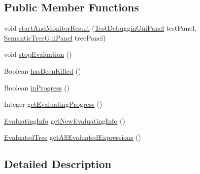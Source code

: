 \subsection*{Public Member Functions}
\begin{DoxyCompactItemize}
\item 
void \hyperlink{interfaceit_1_1emarolab_1_1cagg_1_1core_1_1evaluation_1_1interfacing_1_1GuiEvaluationInterface_adfc8f64a0eacda3e0dd7e9ce8a59d37e}{start\-And\-Monitor\-Result} (\hyperlink{classit_1_1emarolab_1_1cagg_1_1debugging_1_1baseComponents_1_1customPanel_1_1TestDebugginGuiPanel}{Test\-Debuggin\-Gui\-Panel} test\-Panel, \hyperlink{classit_1_1emarolab_1_1cagg_1_1debugging_1_1baseComponents_1_1customPanel_1_1SemanticTreeGuiPanel}{Semantic\-Tree\-Gui\-Panel} tree\-Panel)
\item 
void \hyperlink{interfaceit_1_1emarolab_1_1cagg_1_1core_1_1evaluation_1_1interfacing_1_1GuiEvaluationInterface_a9088bd8a49d34a9b9925fc577b226a61}{stop\-Evaluation} ()
\item 
Boolean \hyperlink{interfaceit_1_1emarolab_1_1cagg_1_1core_1_1evaluation_1_1interfacing_1_1GuiEvaluationInterface_abefc2330a6288d4b4ccaed7a530c65ca}{has\-Been\-Killed} ()
\item 
Boolean \hyperlink{interfaceit_1_1emarolab_1_1cagg_1_1core_1_1evaluation_1_1interfacing_1_1GuiEvaluationInterface_a2f8c453178460998dbfe966c5d409652}{in\-Progress} ()
\item 
Integer \hyperlink{interfaceit_1_1emarolab_1_1cagg_1_1core_1_1evaluation_1_1interfacing_1_1GuiEvaluationInterface_a998af18ddb63f0ac9d8bb3423a7b2eab}{get\-Evaluating\-Progress} ()
\item 
\hyperlink{classit_1_1emarolab_1_1cagg_1_1core_1_1evaluation_1_1interfacing_1_1GuiEvaluationInterface_1_1EvaluatingInfo}{Evaluating\-Info} \hyperlink{interfaceit_1_1emarolab_1_1cagg_1_1core_1_1evaluation_1_1interfacing_1_1GuiEvaluationInterface_ac005a4f002a5f0642be21c1202135c3c}{get\-New\-Evaluating\-Info} ()
\item 
\hyperlink{classit_1_1emarolab_1_1cagg_1_1core_1_1evaluation_1_1interfacing_1_1GuiEvaluationInterface_1_1EvaluatedTree}{Evaluated\-Tree} \hyperlink{interfaceit_1_1emarolab_1_1cagg_1_1core_1_1evaluation_1_1interfacing_1_1GuiEvaluationInterface_a30c5a5306a28d4c67641bf55548b25d3}{get\-All\-Evaluated\-Expressions} ()
\end{DoxyCompactItemize}


\subsection{Detailed Description}


